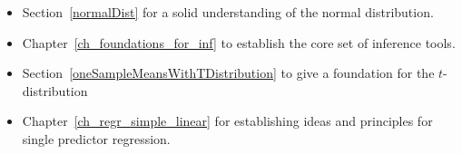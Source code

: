 {\begin{itemize}
	and Section~\ref{categoricalData} for a solid
	introduction to data structures and statistical
	summaries that are used throughout the book.
	\item Section~\ref{normalDist}
	for a solid understanding of the normal distribution.
	\item Chapter~\ref{ch_foundations_for_inf}
	to establish the core set of inference tools.
	\item Section~\ref{oneSampleMeansWithTDistribution}
	to give a foundation for the $t$-distribution
	\item Chapter~\ref{ch_regr_simple_linear}
	for establishing ideas and principles for single
	predictor regression.
\end{itemize}%
}


\ifthenelse{\boolean{croatian}}{%
\subsection*{{\color{oiB}Primjeri i vježbe}}%
}{%
\subsection*{{\color{oiB}Examples and exercises}}
}

